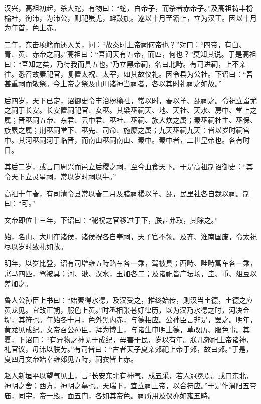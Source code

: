 \documentclass[12pt,UTF8]{ctexbook}
\begin{document}
汉兴，高祖初起，杀大蛇，有物曰：“蛇，白帝子，而杀者赤帝子。”及高祖祷丰枌榆社，徇沛，为沛公，则祀蚩尤，衅鼓旗。遂以十月至霸上，立为汉王。因以十月为年首，色上赤。



二年，东击项籍而还入关，问：“故秦时上帝祠何帝也？”对曰：“四帝，有白、青、黄、赤帝之祠。”高祖曰：“吾闻天有五帝，而四，何也？”莫知其说。于是高祖曰：“吾知之矣，乃待我而具五也。”乃立黑帝祠，名曰北畤。有司进祠，上不亲往。悉召故秦祀官，复置太祝、太宰，如其故仪礼。因令县为公社。下诏曰：“吾甚重祠而敬祭。今上帝之祭及山川诸神当祠者，各以其时礼祠之如故。”



后四岁，天下已定，诏御史令丰治枌榆社，常以时，春以羊、彘祠之。令祝立蚩尤之祠于长安。长安置祠祀官、女巫。其梁巫祠天、地、天社、天水、房中、堂上之属；晋巫祠五帝、东君、云中君、巫社、巫祠、族人炊之属；秦巫祠杜主、巫保、族累之属；荆巫祠堂下、巫先、司命、施糜之属；九天巫祠九天：皆以岁时祠宫中。其河巫祠河于临晋，而南山巫祠南山、秦中。秦中者，二世皇帝也。各有时日。



其后二岁，或言曰周兴而邑立后稷之祠，至今血食天下。于是高祖制诏御史：“其令天下立灵星祠，常以岁时祠以牛。”



高祖十年春，有司清令县常以春二月及腊祠稷以羊、彘，民里社各自裁以祠。制曰：“可。”



文帝即位十三年，下诏曰：“秘祝之官移过于下，朕甚弗取，其除之。”



始，名山、大川在诸侯，诸侯祝各自奉祠，天子官不领。及齐、淮南国废，令太祝尽以岁时致礼如故。



明年，以岁比登，诏有司增雍五畤路车各一乘，驾被具；西畤、畦畤寓车各一乘，寓马四匹，驾被具；河、湫、汉水，玉加各二；及诸祀皆广坛场，圭、币、俎豆以差加之。



鲁人公孙臣上书曰：“始秦得水德，及汉受之，推终始传，则汉当土德，土德之应黄龙见。宜改正朔，服色上黄。”时丞相张苍好律历，以为汉乃水德之时，河决金堤，其符也。年始冬十月，色外黑内赤，与德相应。公孙臣言非是，罢之。明年，黄龙见成纪。文帝召公孙臣，拜为博士，与诸生申明土德，草改历、服色事。其夏，下诏曰：“有异物之神见于成纪，毋害于民，岁以有年。朕几郊祀上帝诸神，礼官议，毋讳以朕劳。”有司皆曰：“古者天子夏亲郊祀上帝于郊，故曰郊。”于是，夏四月文帝始幸雍郊见五畤，祠衣皆上赤。



赵人新垣平以望气见上，言“长安东北有神气，成五采，若人冠冕焉。或曰东北，神明之舍；西方，神明之墓也。天瑞下，宜立祠上帝，以合符应。”于是作渭阳五帝庙，同宇，帝一殿，面五门，各如其帝色。祠所用及仪亦如雍五畤。
\end{document}
